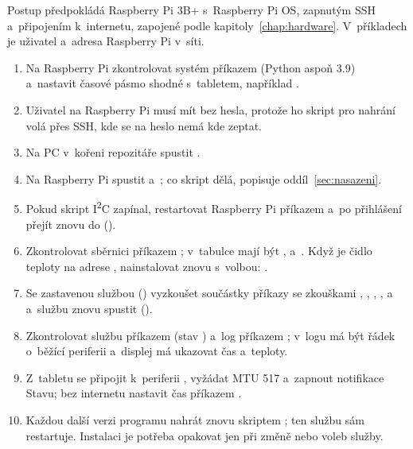 Postup předpokládá Raspberry Pi 3B+ s~Raspberry Pi OS, zapnutým SSH a~připojením k~internetu,
zapojené podle kapitoly~\ref{chap:hardware}. V~příkladech je 
uživatel a~adresa Raspberry Pi v~síti.
\begin{enumerate}
  \item Na Raspberry Pi zkontrolovat systém příkazem 
        (Python aspoň 3.9) a~nastavit časové pásmo shodné s~tabletem, například
        .
  \item Uživatel na Raspberry Pi musí mít  bez hesla, protože ho skript pro nahrání
        volá přes SSH, kde se na heslo nemá kde zeptat.
  \item Na PC v~kořeni repozitáře spustit .
  \item Na Raspberry Pi spustit  a~; co skript
        dělá, popisuje oddíl~\ref{sec:nasazeni}.
  \item Pokud skript I\textsuperscript{2}C zapínal, restartovat Raspberry Pi příkazem
         a~po přihlášení přejít znovu do  ().
  \item Zkontrolovat sběrnici příkazem ; v~tabulce mají být ,
         a~. Když je čidlo teploty na adrese , nainstalovat znovu
        s~volbou: .
  \item Se zastavenou službou () vyzkoušet součástky příkazy
         se zkouškami ,
        , , ,  a~ a~službu znovu spustit
        ().
  \item Zkontrolovat službu příkazem  (stav )
        a~log příkazem ; v~logu má být řádek o~běžící periferii
         a~displej má ukazovat čas a~teploty.
  \item Z~tabletu se připojit k~periferii , vyžádat MTU 517 a~zapnout notifikace
        Stavu; bez internetu nastavit čas příkazem .
  \item Každou další verzi programu nahrát znovu skriptem ; ten službu sám
        restartuje. Instalaci je potřeba opakovat jen při změně  nebo
        voleb služby.
\end{enumerate}
